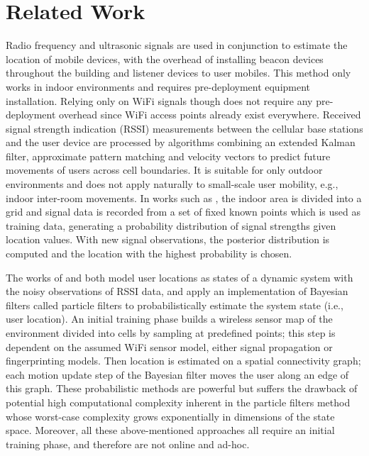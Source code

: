 \section{Related Work}
Radio frequency and ultrasonic signals are used in conjunction \cite{priyantha2000cricket} to estimate the location of mobile devices, with the overhead of installing beacon devices throughout the building and listener devices to user mobiles.  This method only works in indoor environments and requires pre-deployment equipment installation.  Relying only on WiFi signals though does not require any pre-deployment overhead since WiFi access points already exist everywhere.
Received signal strength indication (RSSI) measurements between the cellular base stations and the user device \cite{liu1997hierarchical} are processed by algorithms combining an extended Kalman filter, approximate pattern matching and velocity vectors to predict future movements of users across cell boundaries.  It is suitable for only outdoor environments and does not apply naturally to small-scale user mobility, e.g., indoor inter-room movements.
In works such as \cite{roos2002probabilistic,smailagic2002location},
the indoor area is divided into a grid and signal data is recorded from a set of fixed known points which is used as training data, generating a probability distribution of signal strengths given location values.  With new signal observations, the posterior distribution is computed and the location with the highest probability is chosen.  

The works of \cite{seshadri2005bayesian} and \cite{letchner2005large} both model user locations as states of a dynamic system with the noisy observations of RSSI data, and apply an implementation of Bayesian filters called particle filters to probabilistically estimate the system state (i.e., user location).  An initial training phase builds a wireless sensor map of the environment divided into cells by sampling at predefined points; this step is dependent on the assumed WiFi sensor model, either signal propagation or fingerprinting models.  Then location is estimated on a spatial connectivity graph; each motion update step of the Bayesian filter moves the user along an edge of this graph.  These probabilistic methods are powerful but suffers the drawback of potential high computational complexity inherent in the particle filters method whose worst-case complexity grows exponentially in dimensions of the state space.
Moreover, all these above-mentioned approaches all require an initial training phase, and therefore are not online and ad-hoc.

